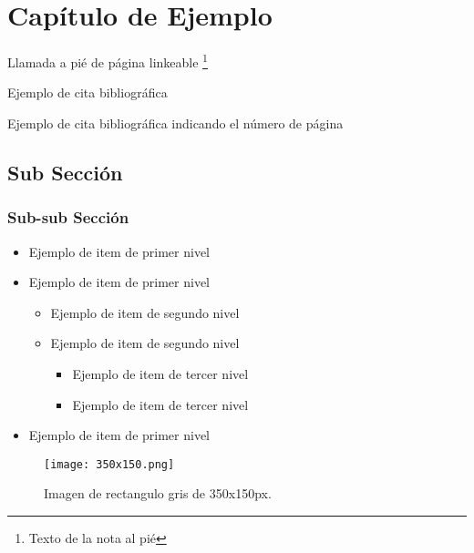 \chapter{Capítulo de Ejemplo}

Llamada a pié de página linkeable \footnote{Texto de la nota al pié}\par
Ejemplo de cita bibliográfica \cite{nordquist2020basic}\par
Ejemplo de cita bibliográfica indicando el número de página \cite[pág 21]{stokoe2005sign}\par
\lipsum[1-2]

\section{Sub Sección}
   \lipsum[1-2]

\subsection{Sub-sub Sección}
   \lipsum[1]
   \begin{itemize}
      \item Ejemplo de item de primer nivel
      \item Ejemplo de item de primer nivel 
      \begin{itemize}
         \item Ejemplo de item de segundo nivel
         \item Ejemplo de item de segundo nivel
         \begin{itemize}
            \item Ejemplo de item de tercer nivel
            \item Ejemplo de item de tercer nivel
         \end{itemize}
      \end{itemize}
      \item Ejemplo de item de primer nivel 
   \end{itemize}

   \lipsum[1-2]


      \begin{figure}[h]
         \centering
         \texttt{[image: 350x150.png]}
         \caption[Imagen Ejemplo]{Imagen de rectangulo gris de 350x150px.}
         \label{imagendesc1}
      \end{figure}


